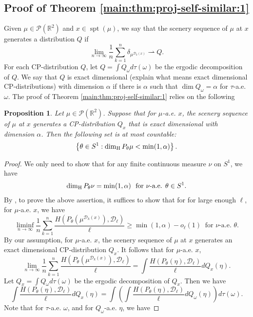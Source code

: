 \documentclass[a4paper,11pt]{amsart}
\newtheorem{proposition}[theorem]{Proposition}
\theoremstyle{definition}
\numberwithin{equation}{section}
\def\to{\rightarrow}
\def\wto{\rightharpoonup}
\def\D{\mathcal{D}}
\def\cP{\mathcal P}
\def\R{\mathbb R}
\DeclareMathOperator{\spt}{spt}
\begin{document}
\iffalse
{\color{blue}
\subsection{Proof of Theorem \ref{main:thm:proj-self-similar:1}}
Given  $\mu\in \cP(\R^2)$ and $x\in \spt(\mu)$, we say that the scenery sequence of $\mu$ at $x$ generates a distribution $Q$ if 
\[
\lim_{n\to\infty}\frac{1}{n} \sum_{k=1}^{n}\delta_{\mu^{\D_k(x)}}\wto Q.
\]
For each CP-distribution $Q$, let $Q=\int Q_\omega d\tau(\omega)$  be the ergodic decomposition of $Q$.  We say that $Q$ is exact dimensional {\color{red}(explain what means exact dimensional CP-distributions)} with dimension $\alpha$ if there is $\alpha$ such that $\dim Q_\omega=\alpha$ for $\tau$-a.e.  $\omega$.  
The proof of Theorem \ref{main:thm:proj-self-similar:1} relies on the following
\begin{proposition}\label{thm:proj-almost-unif-scaling:1}
Let $\mu\in \cP(\R^2)$.  Suppose  that for $\mu$-a.e. $x$, the scenery sequence of $\mu$ at $x$ generates a CP-distribution $Q_x$ that is exact dimensional with dimension $\alpha$.  Then the following set is at most countable:
\[
\left\{\theta\in S^1: \dim_{\rm H}P_\theta \mu<\min(1,\alpha)  \right\}.
\]
\end{proposition}
\begin{proof}
We only need to show that for any finite continuous measure $\nu$ on $S^1$, we have
\[
\dim_{\rm H}P_\theta\nu=\min(1,\alpha) \ \textrm{ for $\nu$-a.e.  } \theta\in S^1. 
\]
By \cite[Theorem 5.4]{HS2012},  to prove the above assertion, it suffices to show that for for large enough $\ell$,  for $\mu$-a.e.  $x$,  we have
\begin{equation}\label{eq:proof:prop:thm:proj-almost-unif-scaling:1, 1}
\liminf_{n\to\infty}\frac{1}{n}\sum_{k=1}^n\frac{H(P_\theta(\mu^{\D_k(x)}),\D_\ell)}{\ell}  \ge  \min(1,\alpha)-o_\ell(1) \ \textrm{ for $\nu$-a.e.  } \theta.
\end{equation}
By our assumption, for $\mu$-a.e.  $x$, the scenery sequence of $\mu$ at $x$ generates an exact dimensional CP-distribution $Q_x$.  It follows that for $\mu$-a.e.  $x$,
\[
\lim_{n\to\infty}\frac{1}{n}\sum_{k=1}^n\frac{H(P_\theta(\mu^{\D_k(x)}),\D_\ell)}{\ell}  = \int \frac{H(P_\theta(\eta),\D_\ell)}{\ell} dQ_x(\eta).
\]
Let $Q_x=\int Q_\omega d\tau(\omega)$  be the ergodic decomposition of $Q_x$. Then we have
\[
\int \frac{H(P_\theta(\eta),\D_\ell)}{\ell} dQ_x(\eta)= \int \left(\int \frac{H(P_\theta(\eta),\D_\ell)}{\ell} dQ_\omega(\eta)\right) d\tau(\omega).
\]
Note that for $\tau$-a.e.  $\omega$, and for $Q_\omega$-a.e.  $\eta$, we have

\end{proof}}
\end{document}
